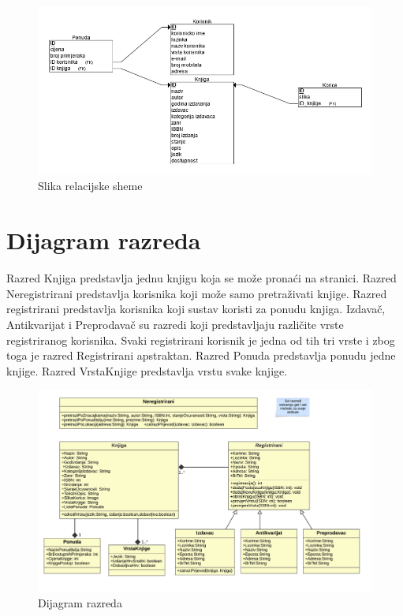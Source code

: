			\begin{figure}
				\centering
				\includegraphics[width = \textwidth]{slike/Relacijska shema}
				\caption{Slika relacijske sheme}
				\label{fig:enter-label}
			\end{figure}
			
			\eject
			
		\section{Dijagram razreda}
		
			\raggedright{Razred Knjiga predstavlja jednu knjigu koja se može pronaći na stranici. Razred Neregistrirani predstavlja korisnika koji može samo pretraživati knjige. Razred registrirani predstavlja korisnika koji sustav koristi za ponudu knjiga. Izdavač, Antikvarijat i Preprodavač su razredi koji predstavljaju različite vrste registriranog korisnika. Svaki registrirani korisnik je jedna od tih tri vrste i zbog toga je razred Registrirani apstraktan. Razred Ponuda predstavlja ponudu jedne knjige. Razred VrstaKnjige predstavlja vrstu svake knjige.}\\
			
			\begin{figure}[h]
				\centering
				\includegraphics[width = \textwidth]{slike/dijagramKlasa.PNG}
				\caption{Dijagram razreda}
				\label{fig:enter-label}
			\end{figure}
			
